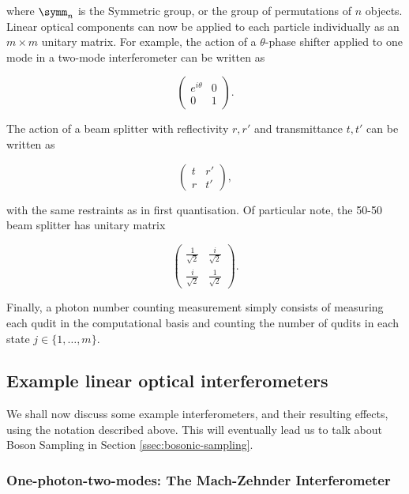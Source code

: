 \noindent where $\symm_n$ is the Symmetric group, or the group of permutations of $n$ objects. Linear optical components can now be applied to each particle individually as an $m \times m$ unitary matrix. For example, the action of a $\theta$-phase shifter applied to one mode in a two-mode interferometer can be written as

\begin{equation}
\begin{pmatrix}
e^{i\theta} & 0\\
0 & 1
\end{pmatrix}.
\end{equation}

\noindent The action of a beam splitter with reflectivity $r, r'$ and transmittance $t, t'$ can be written as

\begin{equation}
\begin{pmatrix}
t & r'\\
r & t'
\end{pmatrix},
\end{equation}

\noindent with the same restraints as in first quantisation. Of particular note, the 50-50 beam splitter has unitary matrix

\begin{equation}
\begin{pmatrix}
\frac{1}{\sqrt{2}} & \frac{i}{\sqrt{2}}\\
\frac{i}{\sqrt{2}} & \frac{1}{\sqrt{2}}
\end{pmatrix}.
\end{equation}

Finally, a photon number counting measurement simply consists of measuring each qudit in the computational basis and counting the number of qudits in each state $j \in \{1,\dots,m\}$.

\subsection{Example linear optical interferometers}
\label{ssec:example-interferometers}

We shall now discuss some example interferometers, and their resulting effects, using the notation described above. This will eventually lead us to talk about Boson Sampling in Section \ref{ssec:bosonic-sampling}.

\subsubsection{One-photon-two-modes: The Mach-Zehnder Interferometer}

